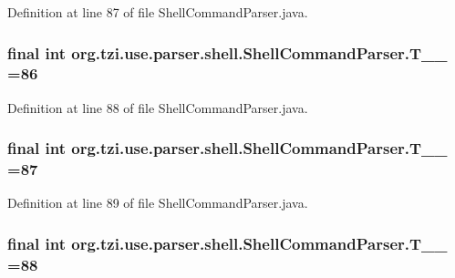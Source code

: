 Definition at line 87 of file Shell\-Command\-Parser.\-java.

\hypertarget{classorg_1_1tzi_1_1use_1_1parser_1_1shell_1_1_shell_command_parser_abaa02acacbcaaebaa62131655deb1e7b}{
\subsubsection[{T\-\_\-\-\_\-86}]{\setlength{\rightskip}{0pt plus 5cm}final int org.\-tzi.\-use.\-parser.\-shell.\-Shell\-Command\-Parser.\-T\-\_\-\-\_ =86\hspace{0.3cm}{\ttfamily [static]}}}\label{classorg_1_1tzi_1_1use_1_1parser_1_1shell_1_1_shell_command_parser_abaa02acacbcaaebaa62131655deb1e7b}


Definition at line 88 of file Shell\-Command\-Parser.\-java.

\hypertarget{classorg_1_1tzi_1_1use_1_1parser_1_1shell_1_1_shell_command_parser_a573ad17ccf5b4bb21def9b8341cfbec5}{
\subsubsection[{T\-\_\-\-\_\-87}]{\setlength{\rightskip}{0pt plus 5cm}final int org.\-tzi.\-use.\-parser.\-shell.\-Shell\-Command\-Parser.\-T\-\_\-\-\_ =87\hspace{0.3cm}{\ttfamily [static]}}}\label{classorg_1_1tzi_1_1use_1_1parser_1_1shell_1_1_shell_command_parser_a573ad17ccf5b4bb21def9b8341cfbec5}


Definition at line 89 of file Shell\-Command\-Parser.\-java.

\hypertarget{classorg_1_1tzi_1_1use_1_1parser_1_1shell_1_1_shell_command_parser_ac8aaa07db849dcf114647256485a1e38}{
\subsubsection[{T\-\_\-\-\_\-88}]{\setlength{\rightskip}{0pt plus 5cm}final int org.\-tzi.\-use.\-parser.\-shell.\-Shell\-Command\-Parser.\-T\-\_\-\-\_ =88\hspace{0.3cm}{\ttfamily [static]}}}\label{classorg_1_1tzi_1_1use_1_1parser_1_1shell_1_1_shell_command_parser_ac8aaa07db849dcf114647256485a1e38}


